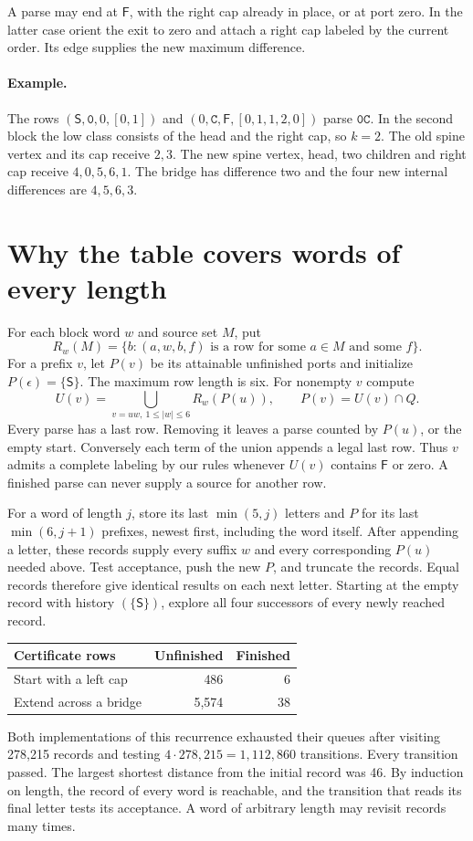 \documentclass[11pt,a4paper]{article}
\newcommand{\start}{\mathsf S}
\newcommand{\finish}{\mathsf F}
\newcommand{\word}[1]{\mathtt{#1}}
\begin{document}
A parse may end at $\finish$, with the right cap already in place, or at port zero. In the latter case orient the exit to zero and attach a right cap labeled by the current order. Its edge supplies the new maximum difference.

\paragraph{Example.} The rows $(\start,\word0,0,[0,1])$ and $(0,\word C,\finish,[0,1,1,2,0])$ parse $\word{0C}$. In the second block the low class consists of the head and the right cap, so $k=2$. The old spine vertex and its cap receive $2,3$. The new spine vertex, head, two children and right cap receive $4,0,5,6,1$. The bridge has difference two and the four new internal differences are $4,5,6,3$.

\newpage
\section{Why the table covers words of every length}
For each block word $w$ and source set $M$, put
\[
 R_w(M)=\{b:(a,w,b,f)\text{ is a row for some }a\in M\text{ and some }f\}.
\]
For a prefix $v$, let $P(v)$ be its attainable unfinished ports and initialize $P(\epsilon)=\{\start\}$. The maximum row length is six. For nonempty $v$ compute
\[
 U(v)=\bigcup_{v=uw,\ 1\le |w|\le6} R_w(P(u)),\qquad P(v)=U(v)\cap Q .
\]
Every parse has a last row. Removing it leaves a parse counted by $P(u)$, or the empty start. Conversely each term of the union appends a legal last row. Thus $v$ admits a complete labeling by our rules whenever $U(v)$ contains $\finish$ or zero. A finished parse can never supply a source for another row.

For a word of length $j$, store its last $\min(5,j)$ letters and $P$ for its last $\min(6,j+1)$ prefixes, newest first, including the word itself. After appending a letter, these records supply every suffix $w$ and every corresponding $P(u)$ needed above. Test acceptance, push the new $P$, and truncate the records. Equal records therefore give identical results on each next letter. Starting at the empty record with history $(\{\start\})$, explore all four successors of every newly reached record.

\begin{center}
\begin{tabular}{lrr}
\hline
Certificate rows & Unfinished & Finished\\\hline
Start with a left cap &486&6\\
Extend across a bridge &5,574&38\\\hline
\end{tabular}
\end{center}
Both implementations of this recurrence exhausted their queues after visiting 278,215 records and testing $4\cdot278{,}215=1{,}112{,}860$ transitions. Every transition passed. The largest shortest distance from the initial record was 46. By induction on length, the record of every word is reachable, and the transition that reads its final letter tests its acceptance. A word of arbitrary length may revisit records many times.
\end{document}

